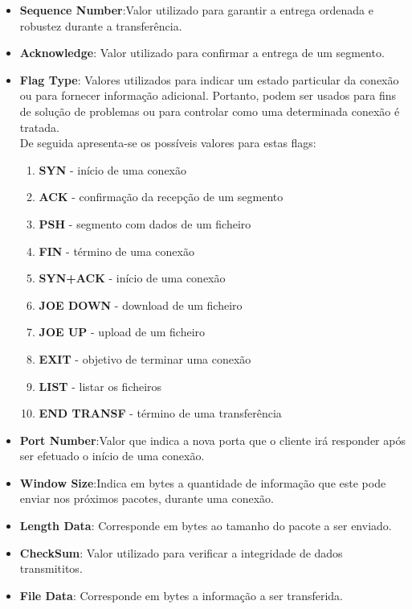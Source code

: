 \documentclass{article}
\begin{document}
\begin{itemize}
    \item \textbf{Sequence Number}:Valor utilizado para garantir a entrega ordenada e robustez durante a transferência. 
    \item \textbf{Acknowledge}: Valor utilizado para confirmar a entrega de um segmento.
    \item \textbf{Flag Type}: Valores utilizados para indicar um estado particular da conexão ou para fornecer informação adicional. Portanto,
    podem ser usados para fins de solução de problemas ou para controlar como uma determinada conexão é tratada.\\
    De seguida apresenta-se os possíveis valores para estas flags:
    \begin{enumerate}
    \item \textbf{SYN} - início de uma conexão
    \item \textbf{ACK} - confirmação da recepção de um segmento
    \item \textbf{PSH} - segmento com dados de um ficheiro
    \item \textbf{FIN} - término de uma conexão
    \item \textbf{SYN+ACK} - início de uma conexão
    \item \textbf{JOE DOWN} - download de um ficheiro
    \item \textbf{JOE UP} - upload de um ficheiro
    \item \textbf{EXIT} - objetivo de terminar uma conexão
    \item \textbf{LIST} - listar os ficheiros
    \item \textbf{END TRANSF} - término de uma transferência
    \end{enumerate}
    \item \textbf{Port Number}:Valor que indica a nova porta que o cliente irá responder após ser efetuado o início de uma conexão.
    \item \textbf{Window Size}:Indica em bytes a quantidade de informação que este pode enviar nos próximos pacotes, durante uma conexão.
    \item \textbf{Length Data}: Corresponde em bytes ao tamanho do pacote a ser enviado.
    \item \textbf{CheckSum}: Valor utilizado para verificar a integridade de dados transmititos.
    \item \textbf{File Data}: Corresponde em bytes a informação a ser transferida.
\end{itemize}
\end{document}
